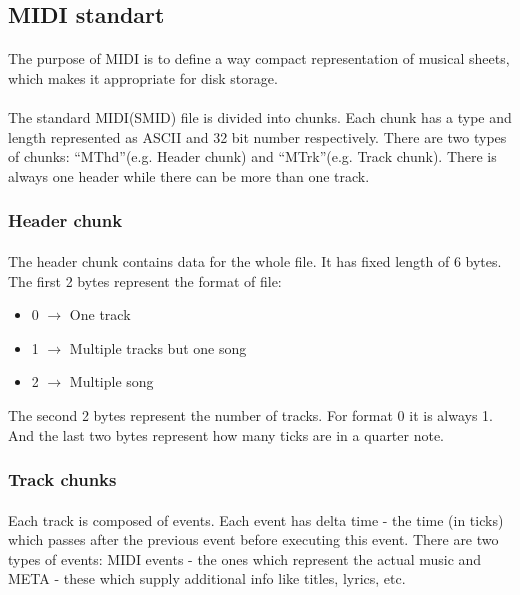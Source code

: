 \documentclass[]{article}
\begin{document}
        \subsection {MIDI standart}
        \paragraph{} The purpose of MIDI\cite{midi} is to define a way compact representation of musical sheets, which makes it appropriate for disk storage.\paragraph{}
            The standard MIDI(SMID) file is divided into chunks. Each chunk has a type and length represented as ASCII and 32 bit number respectively. There are two types of chunks: ``MThd''(e.g. Header chunk) and ``MTrk''(e.g. Track chunk). There is always one header while there can be more than one track.
            \subsubsection{Header chunk}
            \paragraph{}The header chunk contains data for the whole file. It has fixed length of 6 bytes. The first 2 bytes represent the format of file:
                \begin{itemize}
                    \item 0 $\to$ One track
                    \item 1 $\to$ Multiple tracks but one song
                    \item 2 $\to$ Multiple song
                \end{itemize}
                The second 2 bytes represent the number of tracks. For format 0 it is always 1. And the last two bytes represent how many ticks are in a quarter note.
            \subsubsection{Track chunks}
            \paragraph{}Each track is composed of events. Each event has delta time - the time (in ticks) which passes after the previous event before executing this event. There are two types of events: MIDI events - the ones which represent the actual music and META - these which supply additional info like titles, lyrics, etc.
\end{document}
